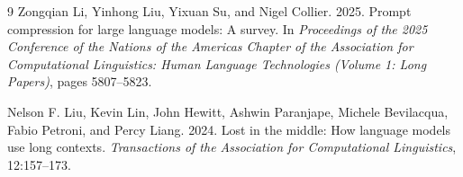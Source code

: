 ﻿\documentclass[10pt,a4paper,twocolumn]{article}
\begin{document}
\begin{thebibliography}{9}
Zongqian Li, Yinhong Liu, Yixuan Su, and Nigel Collier. 2025.
\newblock Prompt compression for large language models: A survey.
\newblock In \emph{Proceedings of the 2025 Conference of the Nations of the Americas Chapter of the Association for Computational Linguistics: Human Language Technologies (Volume 1: Long Papers)}, pages 5807--5823.

Nelson F. Liu, Kevin Lin, John Hewitt, Ashwin Paranjape, Michele Bevilacqua, Fabio Petroni, and Percy Liang. 2024.
\newblock Lost in the middle: How language models use long contexts.
\newblock \emph{Transactions of the Association for Computational Linguistics}, 12:157--173.

\end{thebibliography}
\end{document}
